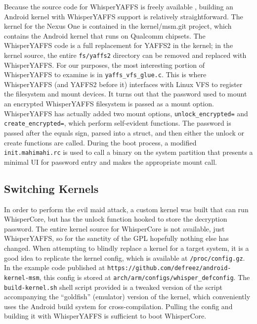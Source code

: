 Because the source code for WhisperYAFFS is freely available \cite{whisperyaffs}, building an Android kernel with WhisperYAFFS
support is relatively straightforward. The kernel for the Nexus One is contained in the kernel/msm.git project, which contains the
Android kernel that runs on Qualcomm chipsets.  The WhisperYAFFS code is a full replacement for YAFFS2 in the kernel; in the kernel
source, the entire \texttt{fs/yaffs2} directory can be removed and replaced with WhisperYAFFS.  For our purposes, the most
interesting portion of WhisperYAFFS to examine is in \texttt{yaffs\_vfs\_glue.c}.  This is where WhisperYAFFS (and YAFFS2 before it)
interfaces with Linux VFS to register the filesystem and mount devices.  It turns out that the password used to mount an encrypted
WhisperYAFFS filesystem is passed as a mount option.  WhisperYAFFS has actually added two mount options, \texttt{unlock\_encrypted=}
and \texttt{create\_encrypted=}, which perform self-evident functions.  The password is passed after the equals sign, parsed into a
struct, and then either the unlock or create functions are called.  During the boot process, a modified \texttt{init.mahimahi.rc} is
used to call a binary on the system partition that presents a minimal UI for password entry and makes the appropriate mount call. 

\subsection{Switching Kernels}
In order to perform the evil maid attack, a custom kernel was built that can run WhisperCore, but has the unlock function hooked
to store the decryption password.  The entire kernel source for WhisperCore is not available, just WhisperYAFFS, so for the sanctity
of the GPL hopefully nothing else has changed.  When attempting to blindly replace a kernel for a target system, it is a good idea
to replicate the kernel config, which is available at \texttt{/proc/config.gz}.  In the example code published at
\texttt{https://github.com/defreez/android-kernel-msm}, this config is stored at \texttt{arch/arm/configs/whisper\_defconfig}.  The
\texttt{build-kernel.sh} shell script provided is a tweaked version of the script accompanying the ``goldfish'' (emulator) version
of the kernel, which conveniently uses the Android build system for cross-compilation.  Pulling the config and building it with
WhisperYAFFS is sufficient to boot WhisperCore.

